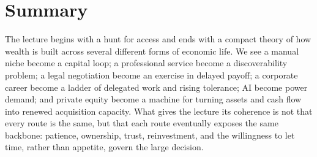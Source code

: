\section{Summary}

The lecture begins with a hunt for access and ends with a compact theory of how wealth is built across several different forms of economic life. We see a manual niche become a capital loop; a professional service become a discoverability problem; a legal negotiation become an exercise in delayed payoff; a corporate career become a ladder of delegated work and rising tolerance; AI become power demand; and private equity become a machine for turning assets and cash flow into renewed acquisition capacity. What gives the lecture its coherence is not that every route is the same, but that each route eventually exposes the same backbone: patience, ownership, trust, reinvestment, and the willingness to let time, rather than appetite, govern the large decision.
